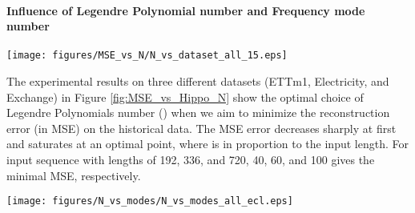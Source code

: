 \documentclass{article}
\begin{document}
\paragraph{Influence of Legendre Polynomial number  and Frequency mode number }
\begin{figure*}[h]
    \centering
    \texttt{[image: figures/MSE\_vs\_N/N\_vs\_dataset\_all\_15.eps]}
\caption{The reconstruction error (MSE) vs. Legendre Polynomial number () on three datasets with three different input lengths.}
    \label{fig:MSE_vs_Hippo_N}
\end{figure*}
The experimental results on three different datasets (ETTm1, Electricity, and Exchange) in Figure \ref{fig:MSE_vs_Hippo_N} show the optimal choice of Legendre Polynomials number () when we aim to minimize the reconstruction error (in MSE) on the historical data. The MSE error decreases sharply at first and saturates at an optimal point, where  is in proportion to the input length. For input sequence with lengths of 192, 336, and 720,   40, 60, and 100 gives the minimal MSE,  respectively. 

\begin{figure*}[h]
    \centering
\texttt{[image: figures/N\_vs\_modes/N\_vs\_modes\_all\_ecl.eps]}
\caption{The MSE error of univariate time series forecasting task on Electricity dataset with different Legendre Polynomials number (), mode number and input length. Left: input length = 192. Mid: input length = 336. Right: input length = 720.}
    \label{fig:MSE_vs_modes_vs_N}
\end{figure*}
\end{document}

